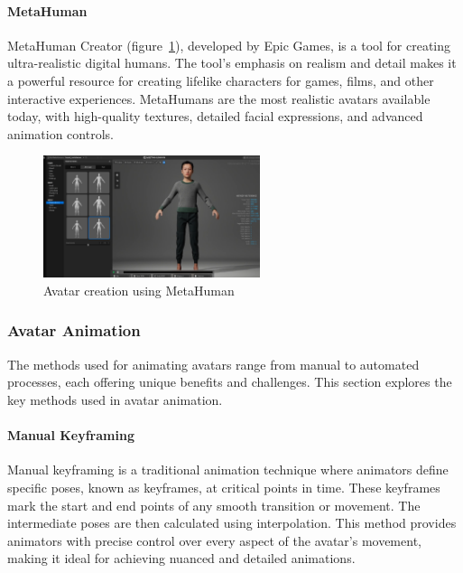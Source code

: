 \documentclass[../../main.tex]{subfiles}
\begin{document}
\paragraph{MetaHuman}
\label{ch:background_work:sign_language_synthesis:3d_techniques:procedural_avatar_creation:metahuman}

MetaHuman Creator (figure~\ref{fig:metahuman_example}), developed by Epic Games, is a tool for creating ultra-realistic digital humans. The tool's emphasis on realism and detail makes it a powerful resource for creating lifelike characters for games, films, and other interactive experiences. MetaHumans are the most realistic avatars available today, with high-quality textures, detailed facial expressions, and advanced animation controls.

\begin{figure} 
  \centering \includegraphics[width = 2.5in]{chapters/background_work/images/metahuman_example.png} 
  \caption{Avatar creation using MetaHuman} 
  \label{fig:metahuman_example}
\end{figure}

\subsubsection{Avatar Animation}
\label{ch:background_work:sign_language_synthesis:3d_techniques:avatar_animation}

The methods used for animating avatars range from manual to automated processes, each offering unique benefits and challenges. This section explores the key methods used in avatar animation.

\paragraph{Manual Keyframing}
\label{ch:background_work:sign_language_synthesis:3d_techniques:avatar_animation:manual_keyframing}

Manual keyframing is a traditional animation technique where animators define specific poses, known as keyframes, at critical points in time. These keyframes mark the start and end points of any smooth transition or movement. The intermediate poses are then calculated using interpolation. This method provides animators with precise control over every aspect of the avatar’s movement, making it ideal for achieving nuanced and detailed animations.
\end{document}
